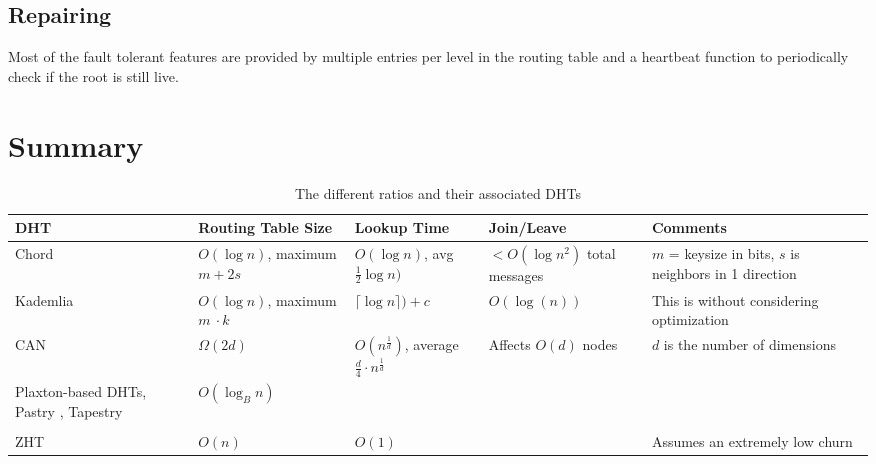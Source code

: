 \documentclass[10pt,letterpaper,twoside]{report}
\begin{document}
\subsection*{Repairing}
Most of the fault tolerant features are provided by multiple entries per level  in the routing table and a heartbeat function to periodically check if the root is still live.









\section{Summary}


\begin{table}[h]
	\small
	\centering
	\begin{tabularx}{\textwidth}{ |X|X|X|X|X| }
		\hline
		DHT & Routing Table Size & Lookup Time & Join/Leave & Comments \\ \hline  
		
		Chord \cite{chord} & $O(\log n)$, maximum $m +2s$ & $O(\log n)$, avg $\frac{1}{2} \log n)$  &  $<O(\log n^{2})$ total messages& $m$  = keysize in bits, $s$ is neighbors in 1 direction  \\ \hline
		
		Kademlia \cite{kademlia} & $O(\log n)$, maximum $m\ \cdot k$ & $\lceil \log n\rceil) + c$ & $O(\log(n))$& This is without considering optimization   \\ \hline
		CAN \cite{can} & $\Omega(2d)$ & $O(n^{\frac{1}{d}})$, average $\frac{d}{4}\cdot n^{\frac{1}{d}}$ & Affects $O(d)$ nodes & $d$ is the number of dimensions \\ \hline
		
		Plaxton-based DHTs, Pastry \cite{pastry}, Tapestry \cite{tapestry} & $O(\log_{B} n)$ & & & \\ \hline
		& & & & \\ \hline  
		ZHT \cite{li2013zht}&   $O(n)$& $O(1)$ &  &Assumes an extremely low churn \\ \hline
	\end{tabularx}
	\caption{The different ratios and their associated DHTs}
	\label{tab:tradeoffs}
\end{table}
\end{document}
